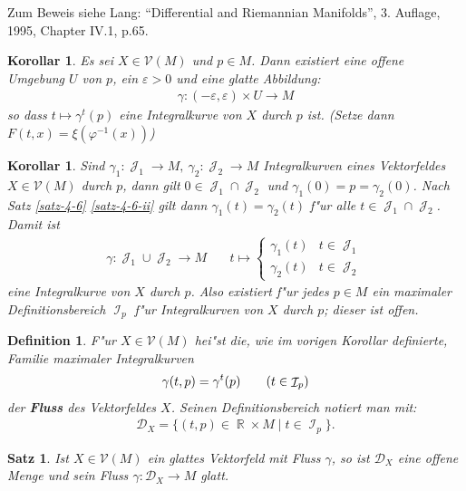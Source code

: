 \documentclass[paper=A4, twoside, chapterprefix=true, bibliography=totoc, headsepline]{scrbook}
\let\temp\phi{}
\let\phi\varphi{}
\let\varphi\temp{}
\let\temp\theta{}
\let\theta\vartheta{}
\let\vartheta\temp{}
\let\temp\epsilon{}
\let\epsilon\varepsilon{}
\let\varepsilon\temp{}
\let\temp\rho{}
\let\rho\varrho{}
\let\varrho\temp{}
\DeclareMathOperator{\R}{\mathbb{R}}
\DeclareMathOperator{\calI}{\mathcal{I}}
\DeclareMathOperator{\calJ}{\mathcal{J}}
\theoremstyle{plain}
\newtheorem{Satz}[Dfn]{Satz}
\newtheorem{Kor}[Dfn]{Korollar}
\theoremstyle{nonumberplain}
\newtheorem{dfn}{Definition}
\theoremstyle{empty}
\theoremstyle{break}
\newcommand{\CmIndex}[2][]{\ifthenelse{\isempty{#1}}{\index{#2}}{\index{#1}}#2}
\newcommand{\CmMark}[2][]{\textbf{\CmIndex[#1]{#2}}}
\begin{document}
Zum Beweis siehe Lang: "`Differential and Riemannian Manifolds"', 3. Auflage, 1995, Chapter IV.1, p.65\cite{lang1995differential}.

\begin{Kor}\label{korollar-4-7}\label{kor-4-7}
  Es sei $X \in \mathcal V(M)$ und $p \in M$. Dann existiert eine offene Umgebung $U$ von $p$, ein $\epsilon > 0$ und eine glatte Abbildung:
  \begin{align*}
    \gamma\colon(-\epsilon,\epsilon) \times U \to M
  \end{align*}
  so dass $t \mapsto \gamma^t(p)$ eine Integralkurve von $X$ durch $p$ ist. (Setze dann $F(t,x) = \xi(\phi^{-1}(x))$)
\end{Kor}

\begin{Kor}\label{korollar-4-8}
  Sind $\gamma_1 \colon \calJ_1 \to M, \ \gamma_2 \colon \calJ_2 \to M$ Integralkurven eines Vektorfeldes $X \in \mathcal V(M)$ durch $p$, dann gilt $0 \in \calJ_1 \cap \calJ_2$ und $\gamma_1(0)= p = \gamma_2(0)$.
  Nach Satz \ref{satz-4-6} \ref{satz-4-6-ii} gilt dann $\gamma_1(t) = \gamma_2(t)$ f"ur alle $t \in \calJ_1 \cap \calJ_2$. Damit ist
  \begin{align*}
    \gamma \colon \calJ_1 \cup \calJ_2 \to M && \ t \mapsto 
    \begin{cases}
      \gamma_1(t) & t \in \calJ_1\\
      \gamma_2(t) & t \in \calJ_2
    \end{cases}
  \end{align*}
  eine Integralkurve von $X$ durch $p$.
  Also existiert f"ur jedes $p \in M$ ein maximaler Definitionsbereich $\calI_p$ f"ur Integralkurven von $X$ durch $p$; dieser ist offen.
\end{Kor}

\begin{dfn}
  F"ur $X \in \mathcal V(M)$ hei"st die, wie im vorigen Korollar definierte, Familie maximaler Integralkurven
  \begin{align*}
    \gamma(t,p) = \gamma^t(p) \tag{$t \in \calI_p$}
  \end{align*}
  der \CmMark{Fluss} des Vektorfeldes $X$.
  Seinen Definitionsbereich notiert man mit:
  \begin{align*}
    \mathcal D_X = \{(t,p) \in \R \times M \mid t \in \calI_p\}.
  \end{align*}
\end{dfn}

\begin{Satz}\label{satz-4-9}
  Ist $X \in \mathcal V(M)$ ein glattes Vektorfeld mit Fluss $\gamma$, so ist $\mathcal D_X$ eine offene Menge und sein Fluss $\gamma \colon \mathcal D_X \to M$ glatt.
\end{Satz}
\end{document}
